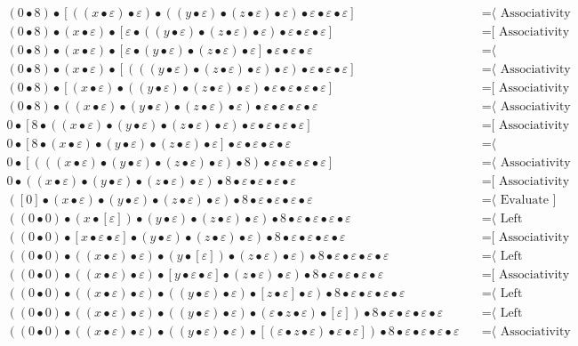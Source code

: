 \documentclass{article}
\begin{document}
\begin{align*}
(0 • 8) • [((x • ε) • ε) • ((y • ε) • (z • ε) • ε) • ε • ε • ε]
  & \quad \text{=⟨ Associativity ]}\\
(0 • 8) • (x • ε) • [ε • ((y • ε) • (z • ε) • ε) • ε • ε • ε]
  & \quad \text{=[ Associativity ⟩}\\
(0 • 8) • (x • ε) • [ε • (y • ε) • (z • ε) • ε] • ε • ε • ε
  & \quad \text{=⟨ Commutativity ]}\\
(0 • 8) • (x • ε) • [(((y • ε) • (z • ε) • ε) • ε) • ε • ε • ε]
  & \quad \text{=⟨ Associativity ]}\\
(0 • 8) • [(x • ε) • ((y • ε) • (z • ε) • ε) • ε • ε • ε • ε]
  & \quad \text{=[ Associativity ⟩}\\
(0 • 8) • ((x • ε) • (y • ε) • (z • ε) • ε) • ε • ε • ε • ε
  & \quad \text{=⟨ Associativity ]}\\
0 • [8 • ((x • ε) • (y • ε) • (z • ε) • ε) • ε • ε • ε • ε]
  & \quad \text{=[ Associativity ⟩}\\
0 • [8 • (x • ε) • (y • ε) • (z • ε) • ε] • ε • ε • ε • ε
  & \quad \text{=⟨ Commutativity ]}\\
0 • [(((x • ε) • (y • ε) • (z • ε) • ε) • 8) • ε • ε • ε • ε]
  & \quad \text{=⟨ Associativity ]}\\
0 • ((x • ε) • (y • ε) • (z • ε) • ε) • 8 • ε • ε • ε • ε
  & \quad \text{=[ Associativity ⟩}\\
([0] • (x • ε) • (y • ε) • (z • ε) • ε) • 8 • ε • ε • ε • ε
  & \quad \text{=⟨ Evaluate ]}\\
((0 • 0) • (x • [ε]) • (y • ε) • (z • ε) • ε) • 8 • ε • ε • ε • ε
  & \quad \text{=⟨ Left neutrality ]}\\
((0 • 0) • [x • ε • ε] • (y • ε) • (z • ε) • ε) • 8 • ε • ε • ε • ε
  & \quad \text{=[ Associativity ⟩}\\
((0 • 0) • ((x • ε) • ε) • (y • [ε]) • (z • ε) • ε) • 8 • ε • ε • ε • ε
  & \quad \text{=⟨ Left neutrality ]}\\
((0 • 0) • ((x • ε) • ε) • [y • ε • ε] • (z • ε) • ε) • 8 • ε • ε • ε • ε
  & \quad \text{=[ Associativity ⟩}\\
((0 • 0) • ((x • ε) • ε) • ((y • ε) • ε) • [z • ε] • ε) • 8 • ε • ε • ε • ε
  & \quad \text{=⟨ Left neutrality ]}\\
((0 • 0) • ((x • ε) • ε) • ((y • ε) • ε) • (ε • z • ε) • [ε]) • 8 • ε • ε • ε • ε
  & \quad \text{=⟨ Left neutrality ]}\\
((0 • 0) • ((x • ε) • ε) • ((y • ε) • ε) • [(ε • z • ε) • ε • ε]) • 8 • ε • ε • ε • ε
  & \quad \text{=⟨ Associativity ]}\\

\end{align*}
\end{document}
